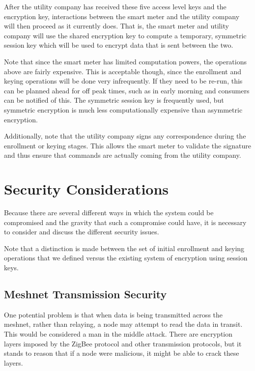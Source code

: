 After the utility company has received these five access level keys and the encryption key, 
interactions between the smart meter and the utility company
will then proceed as it currently does. That is, the smart meter and utility company will use the shared encryption
key to compute a temporary, symmetric session key which will be used to encrypt data that is sent between the two.

Note that since the smart meter has limited computation powers, the operations above are fairly expensive. This
is acceptable though, since the enrollment and keying operations will be done very infrequently. If they need to
be re-run, this can be planned ahead for off peak times, such as in early morning and consumers can be notified
of this. The symmetric session key is frequently used, but symmetric encryption is much less computationally expensive
than asymmetric encryption.

Additionally, note that the utility company signs any correspondence during the enrollment or keying stages.
This allows the smart meter to validate the signature and thus ensure that commands are actually coming
from the utility company.

\section{Security Considerations}
Because there are several different ways in which the system could be compromised and the gravity that
such a compromise could have, it is necessary to consider and discuss the different security issues. 

Note that a distinction is made between the set of initial enrollment and keying operations that we defined versus
the existing system of encryption using session keys.

\subsection{Meshnet Transmission Security}
One potential problem is that when data is being transmitted across the meshnet, rather than relaying, a node
may attempt to read the data in transit. This would be considered a man in the middle attack. There are encryption
layers imposed by the ZigBee protocol and other transmission protocols, but it stands to reason that if a node were
malicious, it might be able to crack these layers.

